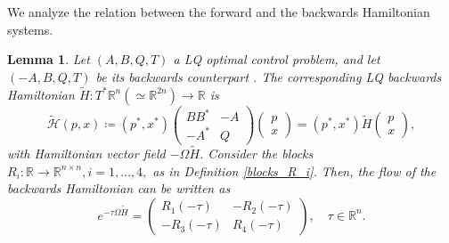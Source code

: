 \documentclass[reqno]{amsart}
\theoremstyle{plain}
\newtheorem{lem}[thm]{Lemma}
\theoremstyle{definition}
\theoremstyle{remark}
\newcommand{\R}{\mathbb{R}}
\begin{document}
We analyze the relation between the forward and the backwards Hamiltonian systems. %
\begin{lem}\label{backwards_flow}
Let $(A,B,Q,T)$ a LQ optimal control problem, and let $(-A,B,Q,T)$ be its backwards counterpart . The corresponding LQ backwards Hamiltonian $\tilde{H}:T^*\mathbb{R}^n(\simeq \R^{2n})\to\mathbb{R}$  is
 \begin{equation}
        \tilde{\mathcal{H}}(p,x) \coloneqq (p^*,x^*)\begin{pmatrix}
				BB^* & -A\\
				-A^* & Q
			\end{pmatrix}\begin{pmatrix}
				p\\
				x
			\end{pmatrix}=(p^*,x^*)\tilde{H}\begin{pmatrix}
				p\\
				x
			\end{pmatrix},
    \end{equation}
		 with Hamiltonian vector field $-\Omega\tilde{H}$. Consider the blocks $R_i:\mathbb{R}\to\mathbb{R}^{n\times n}, i=1,\dots,4,$ as in Definition \ref{blocks_R_i}. Then, the flow of the backwards Hamiltonian can be written as 
		\begin{equation}\label{back_flow}
			e^{-\tau\Omega\tilde{H}}=\begin{pmatrix}
				R_1(-\tau) & -R_2(-\tau)\\
				-R_3(-\tau) & R_4(-\tau)
			\end{pmatrix}, \quad \tau\in\mathbb{R}^n.
		\end{equation} 
	\end{lem}
\end{document}

